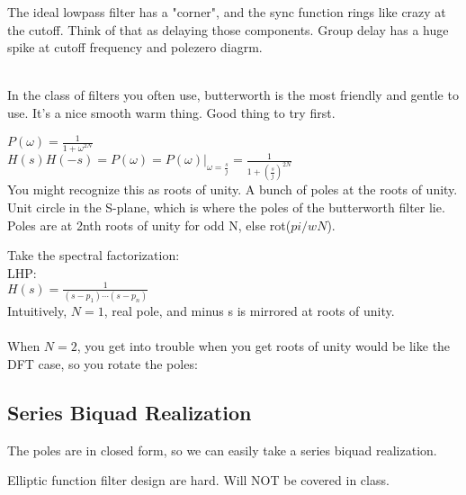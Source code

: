 The ideal lowpass filter has a "corner", and the sync function rings like
crazy at the cutoff. Think of that as delaying those components. 
Group delay has a huge spike at cutoff frequency and polezero diagrm.

 \\

In the class of filters you often use, butterworth is the most friendly and
gentle to use. It's a nice smooth warm thing. Good thing to try first. 

$P(\omega) = \frac{1}{1 + \omega^{2N}}$ \\
$H(s)H(-s) = P(\omega) = P(\omega) \vert_{\omega = \frac{s}{j}}
= \frac{1}{1 + (\frac{s}{j})^{2N}}
$ \\

You might recognize this as roots of unity. A bunch of poles at the roots
of unity. Unit circle in the S-plane, which is where the poles of the butterworth
filter lie. 
 \\

Poles are at 2nth roots of unity for odd N, else rot($pi/wN$).

Take the spectral factorization:  \\
LHP: \\
$H(s) = \frac{1}{(s - p_1) \cdots (s- p_n)}$
 \\

Intuitively, $N =1$, real pole, and minus s is mirrored at roots of unity.\\

\\

When $N = 2$, you get into trouble when you get roots of unity would be like
the DFT case, so you rotate the poles:\\

  


\subsection*{Series Biquad Realization}

The poles are in closed form, so we can easily take a series biquad realization.


Elliptic function filter design are hard. Will NOT be covered in class. 


